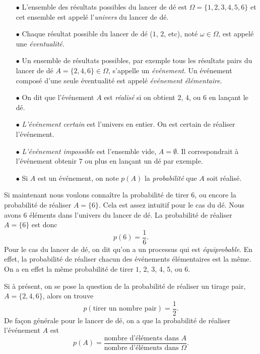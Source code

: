 \documentclass[a4paper,12pt]{book}
\begin{document}
\begin{itemize}
\item[$\bullet$] L'ensemble des résultats possibles du lancer de dé est $\Omega=\{1,2,3,4,5,6\}$ et cet ensemble est appelé l'\textit{univers} du lancer de dé.

\item[$\bullet$] Chaque résultat possible du lancer de dé ($1$, $2$, etc), noté $\omega\in\Omega$, est appelé une \textit{éventualité}.

\item[$\bullet$] Un ensemble de résultats possibles, par exemple tous les résultats pairs du lancer de dé $A=\{2, 4, 6\}\in\Omega$, s'appelle un \textit{événement}.
Un événement composé d'une seule éventualité est appelé \textit{événement élémentaire}.

\item[$\bullet$] On dit que l'événement $A$ est \textit{réalisé} si on obtient $2$, $4$, ou $6$ en lançant le dé.

\item[$\bullet$] \textit{L'événement certain} est l'univers en entier. On est certain de réaliser l'événement. 

\item[$\bullet$] \textit{L'événement impossible} est l'ensemble vide, $A=\emptyset$. Il correspondrait à l'événement obtenir $7$ ou plus en lançant un dé par exemple. 

\item[$\bullet$] Si $A$ est un événement, on note $p(A)$ la \textit{probabilité} que $A$ soit réalisé.
\end{itemize}

Si maintenant nous voulons connaître la probabilité de tirer $6$, ou encore la probabilité de réaliser $A=\{6\}$.  
Cela est assez intuitif pour le cas du dé. Nous avons $6$ éléments dans l'univers
du lancer de dé. La probabilité de réaliser $A=\{6\}$ est donc
\begin{equation}
 p(6)=\frac{1}{6}.
\end{equation}
Pour le cas du lancer de dé, on dit qu'on a un processus qui est \textit{équiprobable}. En effet,
la probabilité de réaliser chacun des événements élémentaires est la même. On a en effet la même probabilité de tirer 
$1$, $2$, $3$, $4$, $5$, ou $6$.

Si à présent, on se pose la question de la probabilité de réaliser un tirage pair, $A=\{2,4,6\}$, 
alors on trouve 
\begin{equation}
 p(\mbox{tirer un nombre pair})=\frac{1}{2}.
\end{equation}
De façon générale pour le lancer de dé, on a que la probabilité de réaliser l'événement $A$ est
\begin{equation}
p(A)=\frac{\mbox{nombre d'éléments dans }A}{\mbox{nombre d'éléments dans }\Omega}.
\end{equation}
\end{document}
